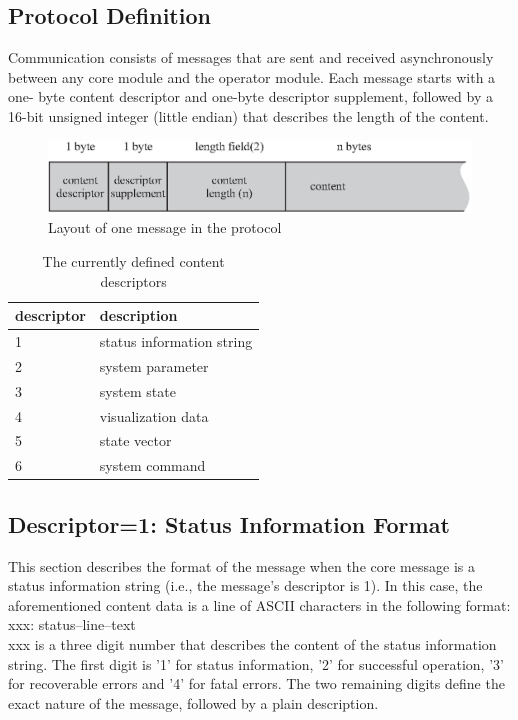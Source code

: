\documentclass[letterpaper,oneside,12pt]{book}
\begin{document}
\subsection{Protocol Definition}
\label{protocol_definition}

Communication consists of messages that are sent and received asynchronously 
between any core module and the operator module. Each message starts with a one-
byte content descriptor and one-byte descriptor supplement, followed by a 16-bit 
unsigned integer (little endian) that describes the length of the content.

\begin{figure}[ht]
 \centerline{\includegraphics{figures/operator_prot.eps}}
 \caption{Layout of one message in the protocol}
\end{figure}

\begin{table}[ht]
 \centering
 \begin{tabular}{|l|l|}
  \hline
  \textbf{descriptor} & \textbf{description} \\
  \hline
  1 & status information string \\
  \hline
  2 & system parameter \\
  \hline
  3 & system state \\
  \hline
  4 & visualization data \\
  \hline
  5 & state vector \\
  \hline
  6 & system command \\
  \hline
 \end{tabular}
 \caption{The currently defined content descriptors}
\end{table}   


\subsection{Descriptor=1: Status Information Format}
\label{statusinfo_format}

This section describes the format of the message when the core message is 
a status information string (i.e., the message's descriptor is 1). In this 
case, the aforementioned content data is a line of ASCII characters 
in the following format:
\\[2ex]
xxx: status--line--text 
\\[2ex]
xxx is a three digit number that describes the content of the status information string. 
The first digit is '1' for status information, '2' for successful operation, '3' 
for recoverable errors and '4' for fatal errors. The two remaining digits define 
the exact nature of the message, followed by a plain description.
\end{document}
